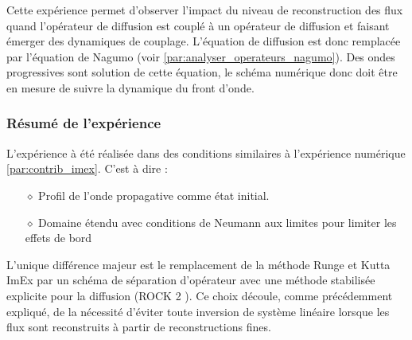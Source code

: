 Cette expérience permet d'observer l'impact du niveau de reconstruction des flux quand l'opérateur de diffusion est couplé à un opérateur de diffusion et faisant émerger des dynamiques de couplage.
L'équation de diffusion est donc remplacée par l'équation de Nagumo (voir \ref{par:analyser_operateurs_nagumo}).
Des ondes progressives sont solution de cette équation, le schéma numérique donc doit être en mesure de suivre la dynamique du front d'onde.

\subsubsection{Résumé de l'expérience}
L'expérience à été réalisée dans des conditions similaires à l'expérience numérique \ref{par:contrib_imex}. 
C'est à dire :
\begin{itemize}
    \item[$\diamond$] Profil de l'onde propagative comme état initial.
    \item[$\diamond$] Domaine étendu avec conditions de Neumann aux limites pour limiter les effets de bord
\end{itemize}
L'unique différence majeur est le remplacement de la méthode Runge et Kutta ImEx par un schéma de séparation d'opérateur avec une méthode stabilisée explicite pour la diffusion (ROCK 2 \cite{AbdulleMedovikov2001}).
Ce choix découle, comme précédemment expliqué, de la nécessité d'éviter toute inversion de système linéaire lorsque les flux sont reconstruits à partir de reconstructions
fines.


